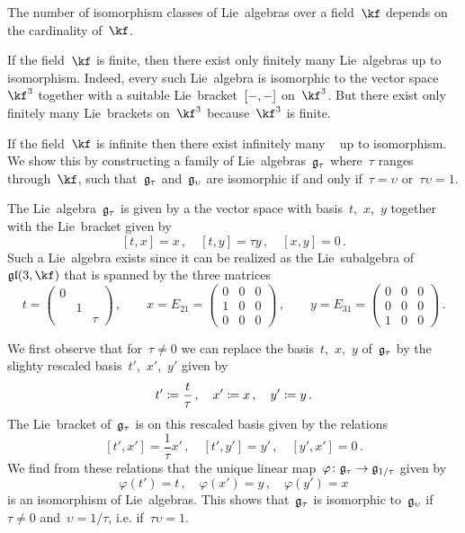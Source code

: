 \begin{example}
	\label{infinitely many three-dimensional lie algebras}
	The number of isomorphism classes of {\threedimensional} Lie~algebras over a field~$\kf$ depends on the cardinality of~$\kf$.

	If the field~$\kf$ is finite, then there exist only finitely many {\threedimensional} Lie~algebras up to isomorphism.
	Indeed, every such Lie~algebra is isomorphic to the vector space~$\kf^3$ together with a suitable Lie~bracket~$[-, -]$ on~$\kf^3$.
	But there exist only finitely many Lie~brackets on~$\kf^3$ because~$\kf^3$ is finite.

	If the field~$\kf$ is infinite then there exist infinitely many {\threedimensional}~\liealgebras{$\kf$} up to isomorphism.
	We show this by constructing a family of Lie~algebras~$\mathfrak{g}_\tau$ where~$\tau$ ranges through~$\kf$, such that~$\mathfrak{g}_\tau$ and~$\mathfrak{g}_\upsilon$ are isomorphic if and only if~$\tau = \upsilon$ or~$\tau \upsilon = 1$.

	The Lie~algebra~$\mathfrak{g}_\tau$ is given by a the vector space with basis~$t$,~$x$,~$y$ together with the Lie~bracket given by
	\[
		[t, x] = x \,,
		\quad
		[t, y] = \tau y \,,
		\quad
		[x, y] = 0 \,.
	\]
	Such a Lie~algebra exists since it can be realized as the Lie~subalgebra of~$\gllie(3, \kf)$ that is spanned by the three matrices
	\[
		t
		=
		\begin{pmatrix}
			0 &   &       \\
				& 1 &       \\
				&   & \tau
		\end{pmatrix} \,,
		\qquad
		x
		=
		E_{21} 
		=
		\begin{pmatrix}
			0 & 0 & 0 \\
			1 & 0 & 0 \\
			0 & 0 & 0
		\end{pmatrix} \,,
		\qquad
		y
		=
		E_{31}
		=
		\begin{pmatrix}
			0 & 0 & 0 \\
			0 & 0 & 0 \\
			1 & 0 & 0
		\end{pmatrix} \,.
	\]

	We first observe that for~$\tau \neq 0$ we can replace the basis~$t$,~$x$,~$y$ of~$\mathfrak{g}_\tau$ by the slighty rescaled basis~$t'$,~$x'$,~$y'$ given by
	\[
		t' \coloneqq \frac{t}{\tau} \,,
		\quad
		x' \coloneqq x \,,
		\quad
		y' \coloneqq y \,.
	\]
	The Lie~bracket of~$\mathfrak{g}_\tau$ is on this rescaled basis given by the relations
	\[
		[t', x'] = \frac{1}{\tau} x' \,,
		\quad
		[t', y'] = y' \,,
		\quad
		[y', x'] = 0 \,.
	\]
	We find from these relations that the unique linear map~$\varphi \colon \glie_{\tau} \to \glie_{1/\tau}$ given by
	\[
		\varphi(t') = t \,,
		\quad
		\varphi(x') = y \,,
		\quad
		\varphi(y') = x
	\]
	is an isomorphism of Lie~algebras.
	This shows that~$\mathfrak{g}_{\tau}$ is isomorphic to~$\mathfrak{g}_{\upsilon}$ if~$\tau \neq 0$ and~$\upsilon = 1/\tau$, i.e. if~$\tau \upsilon = 1$.
	

\end{example}
